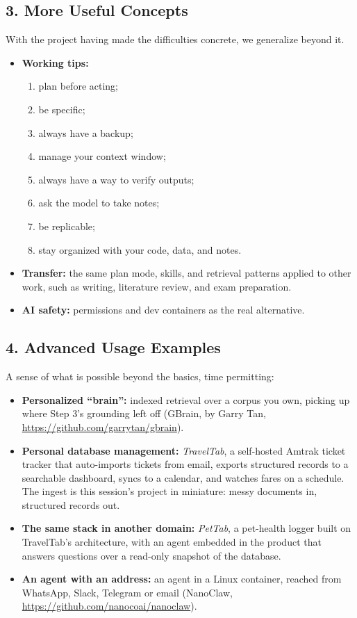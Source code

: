 \documentclass[11pt]{article}
\begin{document}
\subsection*{3. More Useful Concepts}
With the project having made the difficulties concrete, we generalize beyond it.
\begin{itemize}
  \item \textbf{Working tips:} 
  \begin{enumerate}
    \item plan before acting; 
    \item be specific; 
    \item always have a backup; 
    \item manage your context window; 
    \item always have a way to verify outputs; 
    \item ask the model to take notes; 
    \item be replicable; 
    \item stay organized with your code, data, and notes.
  \end{enumerate}
  \item \textbf{Transfer:} the same plan mode, skills, and retrieval patterns applied to other work, such as writing, literature review, and exam preparation.
  \item \textbf{AI safety:} permissions and dev containers as the real alternative.
\end{itemize}

\subsection*{4. Advanced Usage Examples}
A sense of what is possible beyond the basics, time permitting:
\begin{itemize}
  \item \textbf{Personalized ``brain'':} indexed retrieval over a corpus you own, picking up where Step 3's grounding left off (GBrain, by Garry Tan, \url{https://github.com/garrytan/gbrain}).
  \item \textbf{Personal database management:} \emph{TravelTab}, a self-hosted Amtrak ticket tracker that auto-imports tickets from email, exports structured records to a searchable dashboard, syncs to a calendar, and watches fares on a schedule. The ingest is this session's project in miniature: messy documents in, structured records out.
  \item \textbf{The same stack in another domain:} \emph{PetTab}, a pet-health logger built on TravelTab's architecture, with an agent embedded in the product that answers questions over a read-only snapshot of the database.
  \item \textbf{An agent with an address:} an agent in a Linux container, reached from WhatsApp, Slack, Telegram or email (NanoClaw, \url{https://github.com/nanocoai/nanoclaw}).
\end{itemize}
\end{document}
